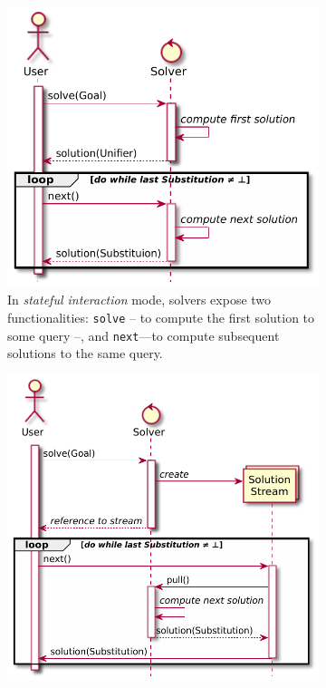 \documentclass[12pt,a4paper,openright,twoside]{book}
\begin{document}
\begin{figure}
    \centering
    \caption{Interaction modes between logic solvers and users or KB}
    \label{fig:user-solver-interaction}
    \begin{subfigure}{0.48\linewidth}\centering
        \includegraphics[width=\linewidth]{figures/stateful-solver.pdf}
        \caption{In \emph{stateful interaction} mode, solvers expose two functionalities: \texttt{solve} -- to compute the first solution to some query --, and \texttt{next}---to compute subsequent solutions to the same query.}
        \label{fig:user-solver-interaction:stateful}
    \end{subfigure}
    \hfill
    \begin{subfigure}{0.48\linewidth}\centering
        \includegraphics[width=\linewidth]{figures/streamful-solver.pdf}

\end{subfigure}
\end{figure}
\end{document}
